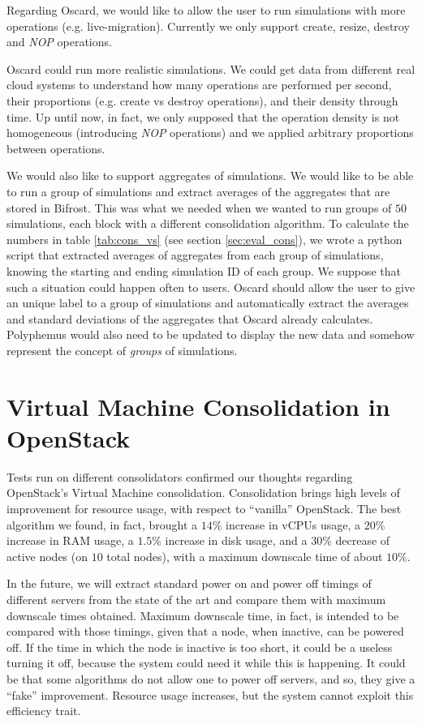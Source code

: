 Regarding Oscard, we would like to allow the user to run simulations with more operations (e.g. live-migration). Currently we only support create, resize, destroy and \textit{NOP} operations.

Oscard could run more realistic simulations. We could get data from different real cloud systems to understand how many operations are performed per second, their proportions (e.g. create vs destroy operations), and their density through time. Up until now, in fact, we only supposed that the operation density is not homogeneous (introducing \textit{NOP} operations) and we applied arbitrary proportions between operations.

We would also like to support aggregates of simulations. We would like to be able to run a group of simulations and extract averages of the aggregates that are stored in Bifrost. This was what we needed when we wanted to run groups of $50$ simulations, each block with a different consolidation algorithm. To calculate the numbers in table \ref{tab:cons_vs} (see section \ref{sec:eval_cons}), we wrote a python script that extracted averages of aggregates from each group of simulations, knowing the starting and ending simulation ID of each group. We suppose that such a situation could happen often to users. Oscard should allow the user to give an unique label to a group of simulations and automatically extract the averages and standard deviations of the aggregates that Oscard already calculates. Polyphemus would also need to be updated to display the new data and somehow represent the concept of \emph{groups} of simulations.

\section{Virtual Machine Consolidation in OpenStack}
\label{sec:conc_cons}
Tests run on different consolidators confirmed our thoughts regarding OpenStack's Virtual Machine consolidation. Consolidation brings high levels of improvement for resource usage, with respect to ``vanilla'' OpenStack. The best algorithm we found, in fact, brought a $14\%$ increase in vCPUs usage, a $20\%$ increase in RAM usage, a $1.5\%$ increase in disk usage, and a $30\%$ decrease of active nodes (on $10$ total nodes), with a maximum downscale time of about $10\%$.

In the future, we will extract standard power on and power off timings of different servers from the state of the art and compare them with maximum downscale times obtained. Maximum downscale time, in fact, is intended to be compared with those timings, given that a node, when inactive, can be powered off. If the time in which the node is inactive is too short, it could be a useless turning it off, because the system could need it while this is happening. It could be that some algorithms do not allow one to power off servers, and so, they give a ``fake'' improvement. Resource usage increases, but the system cannot exploit this efficiency trait.

